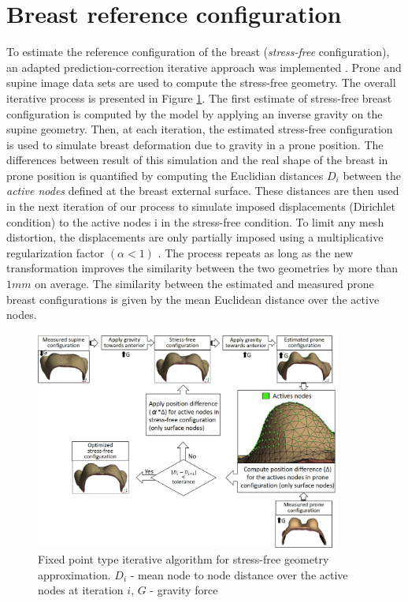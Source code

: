 \section{Breast reference configuration}\label{section:myStressFree}
To estimate the reference configuration of the breast (\textit{stress-free} configuration), an adapted prediction-correction iterative approach was implemented \citep{eiben_breast_2014}. Prone and supine image data sets are used to compute the stress-free geometry. The overall iterative process is presented in Figure \ref{fig:myfixedpointalgo}. The first estimate of stress-free breast configuration is computed by the model by applying an inverse gravity on the supine geometry. Then, at each iteration, the estimated stress-free configuration is used to simulate breast deformation due to gravity in a prone position. The differences between result of this simulation and the real shape of the breast in prone position is quantified by computing the Euclidian distances $D_i$ between the \textit{active nodes} defined at the breast external surface. These distances are then used in the next iteration of our process to simulate imposed displacements (Dirichlet condition) to the active nodes i in the stress-free condition. To limit any mesh distortion, the displacements are only partially imposed using a multiplicative regularization factor $ (\alpha <1)$ . The process repeats as long as the new transformation improves the similarity between the two geometries by more than $1mm$ on average. The similarity between the estimated and measured prone breast configurations is given by the mean Euclidean distance over the active nodes.                                                              

\begin{figure}[!h]
\centering
\includegraphics[width=0.9\textwidth,keepaspectratio]{figures/stress_free_config_algo.jpg} 
\caption{Fixed point type iterative algorithm for stress-free geometry approximation. $D_i$ - mean node to node distance over the active nodes at iteration $i$, $G$ - gravity force}\label{fig:myfixedpointalgo}
\end{figure}

